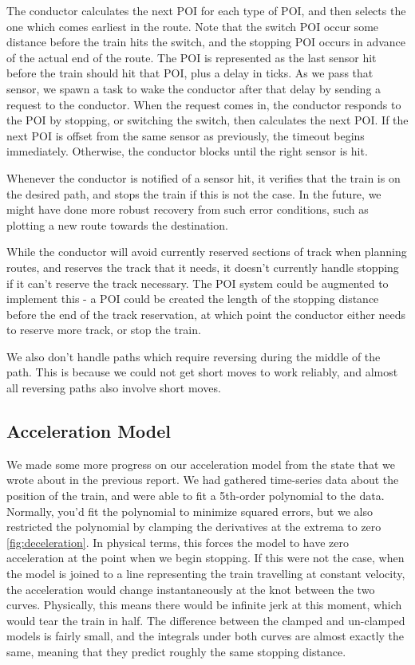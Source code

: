 \documentclass{article}
\begin{document}
The conductor calculates the next POI for each type of POI, and then selects the one which comes earliest in the route.
Note that the switch POI occur some distance before the train hits the switch, and the stopping POI occurs in advance of
the actual end of the route.
The POI is represented as the last sensor hit before the train should hit that POI, plus a delay in ticks.
As we pass that sensor, we spawn a task to wake the conductor after that delay by sending a request to the conductor.
When the request comes in, the conductor responds to the POI by stopping, or switching the switch,
then calculates the next POI.
If the next POI is offset from the same sensor as previously, the timeout begins immediately.
Otherwise, the conductor blocks until the right sensor is hit.

Whenever the conductor is notified of a sensor hit, it verifies that the train is on the desired path, and stops
the train if this is not the case.
In the future, we might have done more robust recovery from such error conditions, such as plotting a new route towards
the destination.

While the conductor will avoid currently reserved sections of track when planning routes, and reserves the track
that it needs, it doesn't currently handle stopping if it can't reserve the track necessary.
The POI system could be augmented to implement this - a POI could be created the length of the stopping distance before the
end of the track reservation, at which point the conductor either needs to reserve more track, or stop the train.

We also don't handle paths which require reversing during the middle of the path.
This is because we could not get short moves to work reliably, and almost all reversing paths also involve short moves.

\subsection{Acceleration Model}
We made some more progress on our acceleration model from the state that we wrote about in the previous report.
We had gathered time-series data about the position of the train, and were able to fit a 5th-order polynomial to
the data.
Normally, you'd fit the polynomial to minimize squared errors, but we also restricted the polynomial by clamping
the derivatives at the extrema to zero \ref{fig:deceleration}.
In physical terms, this forces the model to have zero acceleration at the point
when we begin stopping.
If this were not the case, when the model is joined to a line representing
the train travelling at constant velocity, the acceleration would change instantaneously
at the knot between the two curves.
Physically, this means there would be infinite jerk at this moment, which would tear the
train in half.
The difference between the clamped and un-clamped models is fairly small, and the
integrals under both curves are almost exactly the same, meaning that they predict
roughly the same stopping distance.
\end{document}
